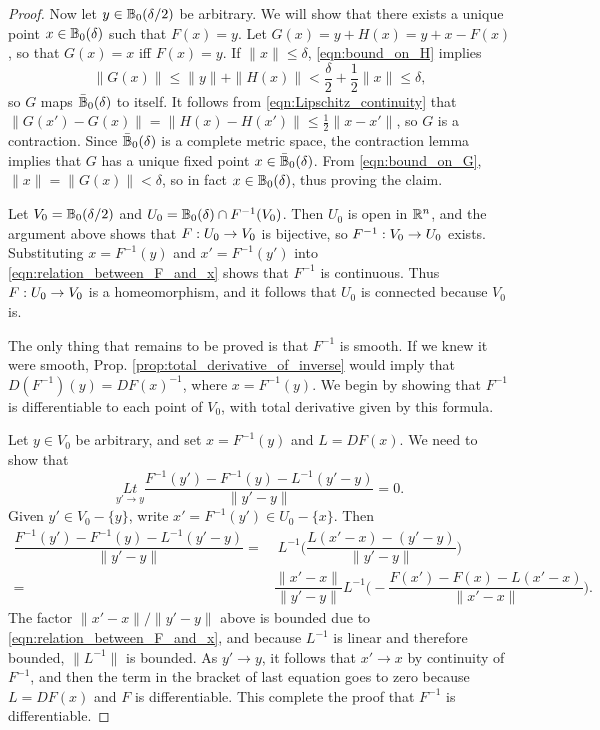 \documentclass[11pt,a4paper]{article}
\begin{document}
\begin{proof}
Now let $y\in \mathbb{B}_0(\delta/2)$ be arbitrary. We will show that there exists a unique point $x\in \mathbb{B}_0(\delta)$ such that $F(x) = y$. Let $G(x) = y + H(x) = y+x-F(x)$, so that $G(x) = x$ iff $F(x) = y$. If $\|x\|\le\delta$, \eqref{eqn:bound_on_H} implies 
\begin{equation}\label{eqn:bound_on_G}
\|G(x)\| \le \|y\| + \|H(x)\| < \frac{\delta}{2} + \frac{1}{2}\|x\|\le \delta,
\end{equation}
so $G$ maps $\bar{\mathbb{B}}_0(\delta)$ to itself. It follows from \eqref{eqn:Lipschitz_continuity} that $\|G(x')-G(x)\| = \|H(x) - H(x')\|\le \frac{1}{2}\|x-x'\|$, so $G$ is a contraction. Since $\bar{\mathbb{B}}_0(\delta)$ is a complete metric space, the contraction lemma implies that $G$ has a unique fixed point $x\in \bar{\mathbb{B}}_0(\delta)$. From \eqref{eqn:bound_on_G}, $\|x\| = \|G(x)\|<\delta$, so in fact $x\in \mathbb{B}_0(\delta)$, thus proving the claim.

Let $V_0 = \mathbb{B}_0(\delta/2)$ and $U_0 = \mathbb{B}_0(\delta)\cap F^{-1}(V_0)$. Then $U_0$ is open in $\mathbb{R}^n$, and the argument above shows that $F:U_0\rightarrow V_0$ is bijective, so $F^{-1}:V_0\rightarrow U_0$ exists. Substituting $x = F^{-1}(y)$ and $x' = F^{-1}(y')$ into \eqref{eqn:relation_between_F_and_x} shows that $F^{-1}$ is continuous. Thus $F:U_0\rightarrow V_0$ is a homeomorphism, and it follows that $U_0$ is connected because $V_0$ is.

The only thing that remains to be proved is that $F^{-1}$ is smooth. If we knew it were smooth, Prop. \ref{prop:total_derivative_of_inverse} would imply that $D(F^{-1})(y) = DF(x)^{-1}$, where $x = F^{-1}(y)$. We begin by showing that $F^{-1}$ is differentiable to each point of $V_0$, with total derivative given by this formula.

Let $y\in V_0$ be arbitrary, and set $x = F^{-1}(y)$ and $L = DF(x)$. We need to show that 
\begin{equation*}
\underset{y'\rightarrow y}{Lt} \dfrac{F^{-1}(y') - F^{-1}(y) - L^{-1}(y'-y)}{\|y'-y\|} = 0.
\end{equation*}
Given $y'\in V_0- \{y\}$, write $x' = F^{-1}(y')\in U_0-\{x\}$. Then
\begin{align*}
\dfrac{F^{-1}(y') - F^{-1}(y) - L^{-1}(y'-y)}{\|y'-y\|} =&\; L^{-1}\bigg( \dfrac{L(x'-x)-(y'-y)}{\|y'-y\|} \bigg) \\
=& \dfrac{\|x'-x\|}{\|y'-y\|}L^{-1}\bigg( - \dfrac{F(x')-F(x)-L(x'-x)}{\|x'-x\|} \bigg).
\end{align*}
The factor $\|x'-x\|/\|y'-y\|$ above is bounded due to \eqref{eqn:relation_between_F_and_x}, and because $L^{-1}$ is linear and therefore bounded, $\|L^{-1}\|$ is bounded. As $y'\rightarrow y$, it follows that $x'\rightarrow x$ by continuity of $F^{-1}$, and then the term in the bracket of last equation goes to zero because $L=DF(x)$ and $F$ is differentiable. This complete the proof that $F^{-1}$ is differentiable.


\end{proof}
\end{document}
